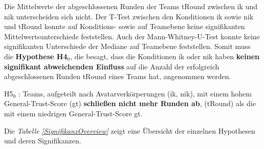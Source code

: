 \documentclass[a4paper,11pt]{article}%
\renewcommand{\\}{\vspace*{0.5\baselineskip} \newline}
\begin{document}
Die Mittelwerte der abgeschlossenen Runden der Teams \ac{tRound} zwischen \ac{ik} und \ac{nik} unterscheiden sich nicht. Der T-Test zwischen den Konditionen \ac{ik} sowie \ac{nik} und \ac{tRound} konnte auf Konditions- sowie auf Teamebene keine signifikanten Mittelwertsunterschiede feststellen. Auch der Mann-Whitney-U-Test konnte keine signifikanten Unterschiede der Mediane auf Teamebene feststellen. Somit muss die \textbf{Hypothese H4$_{0}$}, die besagt, dass die Konditionen \ac{ik} oder \ac{nik} haben \textbf{keinen signifikant abweichenden Einfluss} auf die Anzahl der erfolgreich abgeschlossenen Runden \ac{tRound} eines Teams hat, angenommen werden.


H5$_{0}$ : Teams, aufgeteilt nach Avatarverkörperungen (\ac{ik}, \ac{nik}), mit einem hohem General-Trust-Score (\ac{gt}) \textbf{schließen nicht mehr Runden ab}, (\ac{tRound}) als die mit einem niedrigen General-Trust-Score \ac{gt}.

Die \textit{Tabelle \ref{SignifikanzOverview} } zeigt eine Übersicht der einzelnen Hypothesen und deren Signifikanzen.
\end{document}
